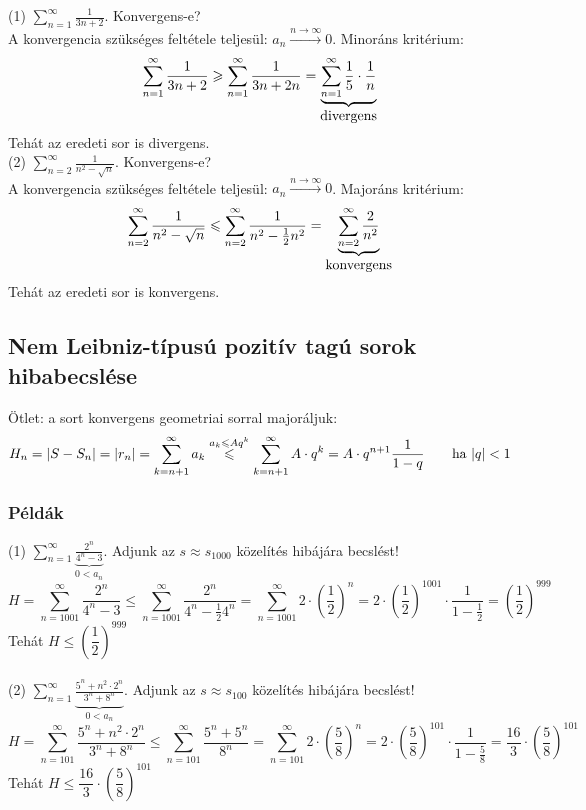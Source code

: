 \documentclass[a4paper,12pt,twoside]{book}
\theoremstyle{break}
\theoremstyle{plain}
\begin{document}
(1) $\displaystyle \sum^\infty_{n=1} \frac{1}{3n+2}$. Konvergens-e?\\
A konvergencia szükséges feltétele teljesül: $a_n \xrightarrow{n\to\infty} 0$. Minoráns kritérium:
\[\sum^\infty_{n=1} \frac{1}{3n+2} \geqslant \sum^\infty_{n=1} \frac{1}{3n+2n} = \underbrace{\sum^\infty_{n=1} \frac{1}{5}\cdot\frac{1}{n}}_{\hbox{divergens}}\]
Tehát az eredeti sor is divergens.\\

(2) $\displaystyle \sum^\infty_{n=2} \frac{1}{n^2-\sqrt{n}}$. Konvergens-e?\\
A konvergencia szükséges feltétele teljesül: $a_n \xrightarrow{n\to\infty} 0$. Majoráns kritérium:
\[\sum^\infty_{n=2} \frac{1}{n^2-\sqrt{n}} \leqslant \sum^\infty_{n=2} \frac{1}{n^2-\frac{1}{2}n^2} = \underbrace{\sum^\infty_{n=2} \frac{2}{n^2}}_{\hbox{konvergens}}\]
Tehát az eredeti sor is konvergens.\\

\subsection{Nem Leibniz-típusú pozitív tagú sorok hibabecslése}

Ötlet: a sort konvergens geometriai sorral majoráljuk:
\[H_n = |S-S_n| = |r_n| = \sum^\infty_{k=n+1} a_k \overset{a_k\leqslant Aq^k}{\leqslant}
  \sum^\infty_{k=n+1} A\cdot q^k = A\cdot q^{n+1} \frac{1}{1-q} \qquad \hbox{ha $|q|<1$}
\]

\subsubsection{Példák}

(1) $\displaystyle \sum^\infty_{n=1} \underbrace{\frac{2^n}{4^n-3}}_{0<a_n}$. Adjunk az $s\approx s_{1000}$ közelítés hibájára becslést!\\
\[H = \sum^\infty_{n=1001} \frac{2^n}{4^n-3} \leqslant \sum^\infty_{n=1001} \frac{2^n}{4^n-\frac{1}{2}4^n} = \sum^\infty_{n=1001} 2\cdot\left(\frac{1}{2}\right)^n = 2\cdot\left(\frac{1}{2}\right)^{1001}\cdot\frac{1}{1-\frac{1}{2}} = \left(\frac{1}{2}\right)^{999}\]
Tehát $H \leqslant \left(\dfrac{1}{2}\right)^{999}$\\
\\

(2) $\displaystyle \sum^\infty_{n=1} \underbrace{\frac{5^n+n^2\cdot 2^n}{3^n+8^n}}_{0<a_n}$. Adjunk az $s\approx s_{100}$ közelítés hibájára becslést!\\
\[H = \sum^\infty_{n=101} \frac{5^n+n^2\cdot 2^n}{3^n+8^n} \leqslant \sum^\infty_{n=101} \frac{5^n+5^n}{8^n} = \sum^\infty_{n=101} 2\cdot \left(\frac{5}{8}\right)^n = 2\cdot \left(\frac{5}{8}\right)^{101}\cdot\frac{1}{1-\frac{5}{8}} = \frac{16}{3}\cdot \left(\frac{5}{8}\right)^{101}\]
Tehát $H \leqslant \dfrac{16}{3}\cdot \left(\dfrac{5}{8}\right)^{101}$
\end{document}
